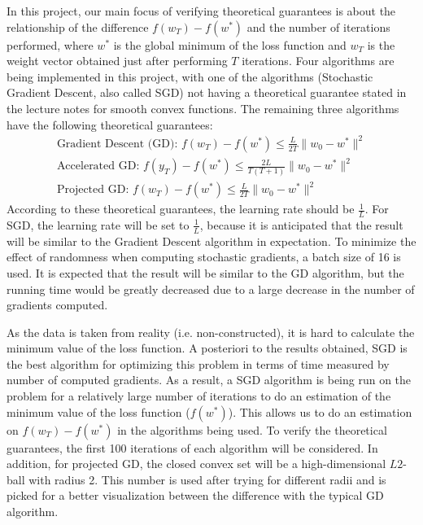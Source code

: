\documentclass[10pt,conference,compsocconf]{IEEEtran}
\begin{document}
In this project, our main focus of verifying theoretical guarantees is about the relationship of the difference $f(w_T)-f(w^*)$ and the number of iterations performed, where $w^*$ is the global minimum of the loss function and $w_T$ is the weight vector obtained just after performing $T$ iterations. Four algorithms are being implemented in this project, with one of the algorithms (Stochastic Gradient Descent, also called SGD) not having a theoretical guarantee stated in the lecture notes for smooth convex functions. The remaining three algorithms have the following theoretical guarantees:
\begin{multline}
\text{Gradient Descent (GD): }f(w_T)-f(w^*)\leq\frac{L}{2T}\|w_0-w^*\|^2\\
\text{Accelerated GD: }f(y_T)-f(w^*)\leq\frac{2L}{T(T+1)}\|w_0-w^*\|^2\\
\text{Projected GD: }f(w_T)-f(w^*)\leq\frac{L}{2T}\|w_0-w^*\|^2
\end{multline}
According to these theoretical guarantees, the learning rate should be $\frac{1}{L}$. For SGD, the learning rate will be set to $\frac{1}{L}$, because it is anticipated that the result will be similar to the Gradient Descent algorithm in expectation. To minimize the effect of randomness when computing stochastic gradients, a batch size of 16 is used. It is expected that the result will be similar to the GD algorithm, but the running time would be greatly decreased due to a large decrease in the number of gradients computed.\par

As the data is taken from reality (i.e. non-constructed), it is hard to calculate the minimum value of the loss function. A posteriori to the results obtained, SGD is the best algorithm for optimizing this problem in terms of time measured by number of computed gradients. As a result, a SGD algorithm is being run on the problem for a relatively large number of iterations to do an estimation of the minimum value of the loss function ($f(w^*)$). This allows us to do an estimation on $f(w_T)-f(w^*)$ in the algorithms being used. To verify the theoretical guarantees, the first 100 iterations of each algorithm will be considered. In addition, for projected GD, the closed convex set will be a high-dimensional $L2$-ball with radius 2. This number is used after trying for different radii and is picked for a better visualization between the difference with the typical GD algorithm.

\end{document}
